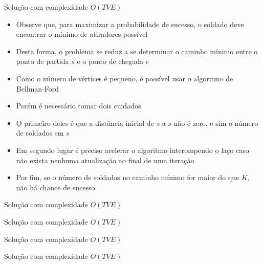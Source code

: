 \begin{frame}[fragile]{Solução com complexidade $O(TVE)$}

    \begin{itemize}
        \item Observe que, para maximizar a probabilidade de sucesso, o soldado deve encontrar
            o mínimo de atiradores possível

        \item Desta forma, o problema se reduz a se determinar o caminho mínimo entre o ponto de
            partida $s$ e o ponto de chegada $e$

        \item Como o número de vértices é pequeno, é possível usar o algoritmo de Bellman-Ford

        \item Porém é necessário tomar dois cuidados

        \item O primeiro deles é que a distância inicial de $s$ a $s$ não é zero, e sim o número
            de soldados em $s$

        \item Em segundo lugar é preciso acelerar o algoritmo interompendo o laço caso não 
            exista nenhuma atualização ao final de uma iteração

        \item Por fim, se o número de soldados no caminho mínimo for maior do que $K$, não
            há chance de sucesso
   \end{itemize}

\end{frame}

\begin{frame}[fragile]{Solução com complexidade $O(TVE)$}
\end{frame}

\begin{frame}[fragile]{Solução com complexidade $O(TVE)$}
\end{frame}

\begin{frame}[fragile]{Solução com complexidade $O(TVE)$}
\end{frame}

\begin{frame}[fragile]{Solução com complexidade $O(TVE)$}
\end{frame}
